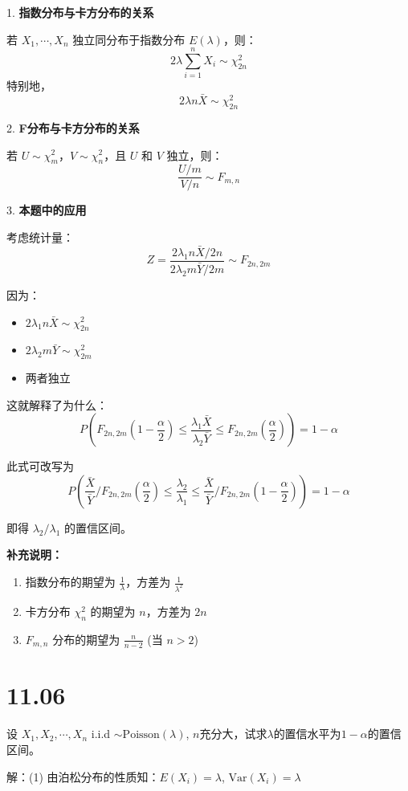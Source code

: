 \documentclass[UTF8]{report}
\theoremstyle{MyLineTheoremStyle} %
\theoremstyle{MyBlockTheoremStyle} %
\theoremstyle{MySubsubsectionStyle} %
\begin{document}
1. \textbf{指数分布与卡方分布的关系}

若 $X_1,\cdots,X_n$ 独立同分布于指数分布 $E(\lambda)$，则：
$$
2\lambda\sum_{i=1}^n X_i \sim \chi^2_{2n}
$$
特别地，
$$
2\lambda n\bar{X} \sim \chi^2_{2n}
$$

2. \textbf{F分布与卡方分布的关系}

若 $U \sim \chi^2_m$，$V \sim \chi^2_n$，且 $U$ 和 $V$ 独立，则：
$$
\frac{U/m}{V/n} \sim F_{m,n}
$$

3. \textbf{本题中的应用}

考虑统计量：
$$
Z = \frac{2\lambda_1 n\bar{X}/2n}{2\lambda_2 m\bar{Y}/2m} \sim F_{2n,2m}
$$

因为：
\begin{itemize}
\item $2\lambda_1 n\bar{X} \sim \chi^2_{2n}$
\item $2\lambda_2 m\bar{Y} \sim \chi^2_{2m}$
\item 两者独立
\end{itemize}

这就解释了为什么：
$$
P\left(F_{2n,2m}\left(1-\frac{\alpha}{2}\right)\leqslant\frac{\lambda_1\bar{X}}{\lambda_2\bar{Y}}\leqslant F_{2n,2m}\left(\frac{\alpha}{2}\right)\right)=1-\alpha
$$

此式可改写为
$$
P\left(\frac{\bar{X}}{\bar{Y}}/F_{2n,2m}\left(\frac{\alpha}{2}\right)\leqslant\frac{\lambda_2}{\lambda_1}\leqslant\frac{\bar{X}}{\bar{Y}}/F_{2n,2m}\left(1-\frac{\alpha}{2}\right)\right)=1-\alpha
$$

即得 $\lambda_2/\lambda_1$ 的置信区间。

\textbf{补充说明：}
\begin{enumerate}
\item 指数分布的期望为 $\frac{1}{\lambda}$，方差为 $\frac{1}{\lambda^2}$
\item 卡方分布 $\chi^2_n$ 的期望为 $n$，方差为 $2n$
\item $F_{m,n}$ 分布的期望为 $\frac{n}{n-2}$ (当 $n > 2$)
\end{enumerate}




\section{11.06}

设 $X_1, X_2, \cdots, X_n$ i.i.d $\sim \text{Poisson}(\lambda)$, $n$充分大，试求$\lambda$的置信水平为$1-\alpha$的置信区间。

解：(1) 由泊松分布的性质知：$E(X_i)=\lambda$, $\text{Var}(X_i)=\lambda$
\end{document}
